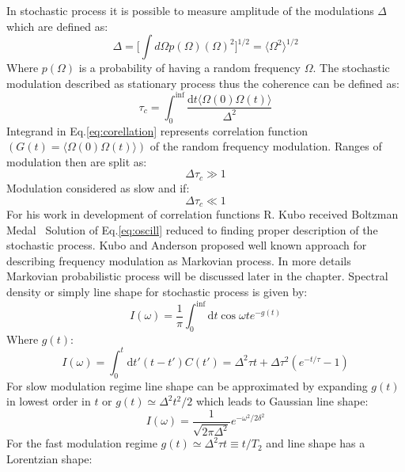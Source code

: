 In stochastic process it is possible to measure amplitude of the modulations $\Delta$ which are defined as:
\begin{equation}\label{eq:harmonoscill}
\Delta=\Big[\int d\Omega p(\Omega)(\Omega)^2\Big]^{1/2}=\langle\Omega^2\rangle^{1/2} 
\end{equation}
Where $p(\Omega)$ is a probability of having a random frequency $\Omega$. The stochastic modulation described as stationary process thus the coherence can be defined as: 
\begin{equation}\label{eq:corellation}
\tau_c=\int_0^{\inf} \frac{\mathrm{d}t\langle\Omega(0)\Omega(t)\rangle}{\Delta^2}
\end{equation}
Integrand in Eq.\ref{eq:corellation} represents correlation function $(G(t)=\langle\Omega(0)\Omega(t)\rangle)$ of the random frequency modulation. Ranges of modulation then are split as: 
\begin{equation}\label{eq:slowmodulation}
\Delta \tau_c \gg 1
\end{equation}
Modulation considered as slow and if: 
\begin{equation}\label{eq:fastmodulation}
\Delta \tau_c \ll 1
\end{equation}
For his work in development of correlation functions R. Kubo received Boltzman Medal~\cite{kubo2} Solution of Eq.\ref{eq:oscill} reduced to finding proper description of the stochastic process. Kubo and Anderson proposed well known approach for describing frequency modulation as Markovian process. In more details Markovian probabilistic process will be discussed later in the chapter. Spectral density or simply line shape for stochastic process is given by: 
\begin{equation}\label{eq:fastmodulation}
I(\omega)=\frac{1}{\pi}\int_0^{\inf}\mathrm{d}t\cos\omega te^{-g(t)}
\end{equation}
Where $g(t)$:
\begin{equation}\label{eq:fastmodulation}
I(\omega)=\int_0^{t}\mathrm{d}t'(t-t')C(t')=\Delta^2\tau t+\Delta\tau^2(e^{-t/\tau}-1)
\end{equation}
For slow modulation regime line shape can be approximated by expanding $g(t)$ in lowest order in $t$ or $g(t)\simeq \Delta^2t^2/2$ which leads to Gaussian line shape: 
\begin{equation}\label{eq:fastmodulation}
I(\omega)=\frac{1}{\sqrt{2\pi\Delta^2}}e^{-\omega^2/2\delta^2}
\end{equation} 
For the fast modulation regime $g(t)\simeq \Delta^2\tau t\equiv t/T_2$ and line shape has a Lorentzian shape: 
